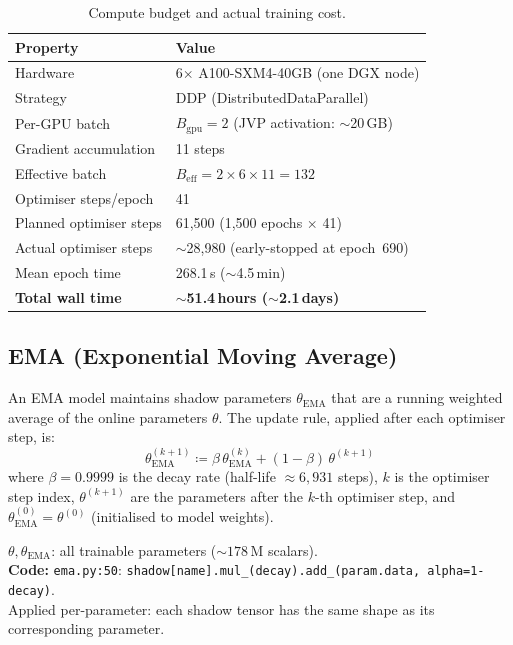 \documentclass[11pt,a4paper]{article}
\newcommand{\EMA}{\mathrm{EMA}}
\newcommand{\code}[1]{\texttt{#1}}
\begin{document}
\begin{table}[ht]
\centering
\caption{Compute budget and actual training cost.}
\label{tab:compute}
\begin{tabular}{ll}
\toprule
\textbf{Property} & \textbf{Value} \\
\midrule
Hardware                   & 6$\times$ A100-SXM4-40GB (one DGX node) \\
Strategy                   & DDP (DistributedDataParallel) \\
Per-GPU batch              & $B_\mathrm{gpu} = 2$ (JVP activation: ${\sim}$20\,GB) \\
Gradient accumulation      & 11 steps \\
Effective batch            & $B_\mathrm{eff} = 2 \times 6 \times 11 = 132$ \\
Optimiser steps/epoch      & 41 \\
Planned optimiser steps    & 61,500 (1,500 epochs $\times$ 41) \\
Actual optimiser steps     & ${\sim}$28,980 (early-stopped at epoch~690) \\
Mean epoch time            & 268.1\,s (${\sim}$4.5\,min) \\
\textbf{Total wall time}   & \textbf{${\sim}$51.4\,hours (${\sim}$2.1\,days)} \\
\bottomrule
\end{tabular}
\end{table}

\subsection{EMA (Exponential Moving Average)}
\label{sec:ema}

An EMA model maintains shadow parameters $\theta_\EMA$ that are a running
weighted average of the online parameters $\theta$.  The update rule, applied
after each optimiser step, is:
\begin{equation}
  \theta_{\EMA}^{(k+1)}
    \coloneqq \beta\,\theta_{\EMA}^{(k)} + (1-\beta)\,\theta^{(k+1)}
  \label{eq:ema}
\end{equation}
where $\beta = 0.9999$ is the decay rate (half-life $\approx 6{,}931$ steps),
$k$ is the optimiser step index, $\theta^{(k+1)}$ are the parameters after the
$k$-th optimiser step, and $\theta_\EMA^{(0)} = \theta^{(0)}$ (initialised to
model weights).
\begin{shapes}
$\theta, \theta_\EMA$: all trainable parameters (${\sim}178$\,M scalars).\\
\textbf{Code:} \code{ema.py:50}: \code{shadow[name].mul\_(decay).add\_(param.data, alpha=1-decay)}.\\
Applied per-parameter: each shadow tensor has the same shape as its corresponding parameter.
\end{shapes}
\end{document}
